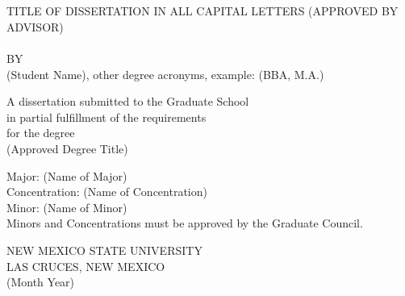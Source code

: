 \renewcommand{\rmdefault}{2}
~\\~\\
\vspace{-48pt}
\begin{center}
TITLE OF DISSERTATION IN ALL CAPITAL LETTERS (APPROVED BY ADVISOR)\\~\\
\vspace{0.075in}
BY\\
\vspace{-10pt}
(Student Name), other degree acronyms, example: (BBA, M.A.)
\end{center}


\vspace{.65in}
\begin{center}
A dissertation submitted to the Graduate School\\
\vspace{-10pt}
in partial fulfillment of the requirements\\
\vspace{-10pt}
for the degree \\
\vspace{-10pt}
(Approved Degree Title)
\end{center}


\vspace{.65in}
\begin{center}
Major: (Name of Major)\\
\vspace{-10pt}
Concentration: (Name of Concentration)\\
\vspace{-10pt}
Minor: (Name of Minor)\\
\vspace{-10pt}
Minors and Concentrations must be approved by the Graduate Council.
\end{center}


\vspace{.65in}
\begin{center}
NEW MEXICO STATE UNIVERSITY\\
\vspace{-10pt}
LAS CRUCES, NEW MEXICO\\
\vspace{-10pt}
(Month Year)
\end{center}

